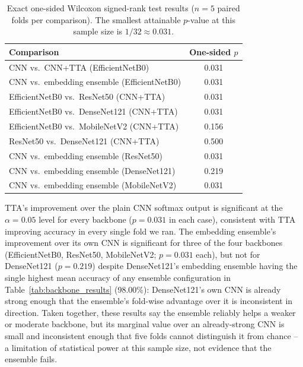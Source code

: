 \documentclass[11pt]{article}
\begin{document}
\begin{table}[htbp]
\centering
\caption{Exact one-sided Wilcoxon signed-rank test results ($n=5$ paired folds per comparison). The smallest attainable $p$-value at this sample size is $1/32 \approx 0.031$.}
\label{tab:wilcoxon}
\small
\begin{tabular}{@{}lc@{}}
\toprule
\textbf{Comparison} & \textbf{One-sided $p$} \\
\midrule
CNN vs.\ CNN+TTA (EfficientNetB0)       & 0.031 \\
CNN vs.\ embedding ensemble (EfficientNetB0) & 0.031 \\
EfficientNetB0 vs.\ ResNet50 (CNN+TTA)  & 0.031 \\
EfficientNetB0 vs.\ DenseNet121 (CNN+TTA) & 0.031 \\
EfficientNetB0 vs.\ MobileNetV2 (CNN+TTA) & 0.156 \\
ResNet50 vs.\ DenseNet121 (CNN+TTA)     & 0.500 \\
CNN vs.\ embedding ensemble (ResNet50)   & 0.031 \\
CNN vs.\ embedding ensemble (DenseNet121) & 0.219 \\
CNN vs.\ embedding ensemble (MobileNetV2) & 0.031 \\
\bottomrule
\end{tabular}
\end{table}

TTA's improvement over the plain CNN softmax output is significant at the $\alpha=0.05$ level for every backbone ($p=0.031$ in each case), consistent with TTA improving accuracy in every single fold we ran. The embedding ensemble's improvement over its own CNN is significant for three of the four backbones (EfficientNetB0, ResNet50, MobileNetV2; $p=0.031$ each), but not for DenseNet121 ($p=0.219$) despite DenseNet121's embedding ensemble having the single highest mean accuracy of any ensemble configuration in Table~\ref{tab:backbone_results} (98.00\%): DenseNet121's own CNN is already strong enough that the ensemble's fold-wise advantage over it is inconsistent in direction. Taken together, these results say the ensemble reliably helps a weaker or moderate backbone, but its marginal value over an already-strong CNN is small and inconsistent enough that five folds cannot distinguish it from chance -- a limitation of statistical power at this sample size, not evidence that the ensemble fails.
\end{document}
